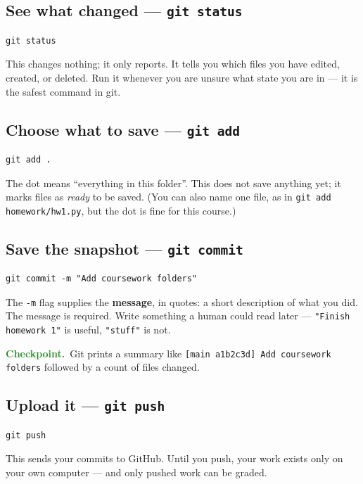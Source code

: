 \documentclass[11pt]{article}
\newcommand{\checkpoint}[1]{\par\smallskip\noindent
  {\small\sffamily\textcolor{ForestGreen}{\textbf{Checkpoint.}}\ #1}\par\smallskip}
\begin{document}
\subsection{See what changed --- \texttt{git status}}
\begin{lstlisting}
git status
\end{lstlisting}

\noindent This changes nothing; it only reports. It tells you which files you
have edited, created, or deleted. Run it whenever you are unsure what state you
are in --- it is the safest command in git.

\subsection{Choose what to save --- \texttt{git add}}
\begin{lstlisting}
git add .
\end{lstlisting}

\noindent The dot means ``everything in this folder''. This does not save
anything yet; it marks files as \emph{ready} to be saved. (You can also name one
file, as in \texttt{git add homework/hw1.py}, but the dot is fine for this
course.)

\subsection{Save the snapshot --- \texttt{git commit}}
\begin{lstlisting}
git commit -m "Add coursework folders"
\end{lstlisting}

\noindent The \texttt{-m} flag supplies the \textbf{message}, in quotes: a short
description of what you did. The message is required. Write something a human
could read later --- \texttt{"Finish homework 1"} is useful,
\texttt{"stuff"} is not.

\checkpoint{Git prints a summary like
\texttt{[main a1b2c3d] Add coursework folders} followed by a count of files
changed.}

\subsection{Upload it --- \texttt{git push}}
\begin{lstlisting}
git push
\end{lstlisting}

\noindent This sends your commits to GitHub. Until you push, your work exists
only on your own computer --- and only pushed work can be graded.
\end{document}
